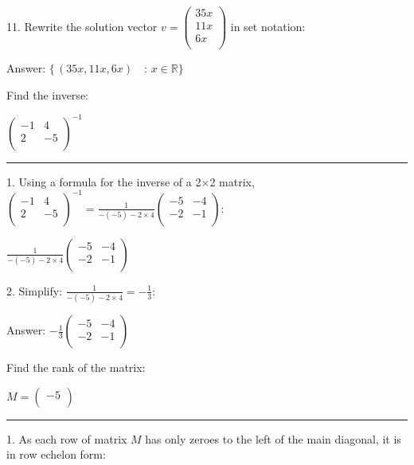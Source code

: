 \documentclass{article}
\begin{document}
11. Rewrite the solution vector $v=\left(
\begin{array}{c}
35 x \\
 11 x \\
 6 x \\
\end{array}
\right)$ in set notation:

Answer: $\{\, (35 x,11 x,6 x)\,\text{ $\, $: }x\in \mathbb{R}\}$

\pagebreak

Find the inverse:

$\left(
\begin{array}{cc}
-1 & 4 \\
 2 & -5 \\
\end{array}
\right)^{-1}$

\hrule

1. Using a formula for the inverse of a 2$\times $2 matrix, $\left(
\begin{array}{cc}
-1 & 4 \\
 2 & -5 \\
\end{array}
\right)^{-1}=\frac{1}{-(-5)-2\times 4}\left(
\begin{array}{cc}
-5 & -4 \\
 -2 & -1 \\
\end{array}
\right):$

$\frac{1}{-(-5)-2\times 4}\left(
\begin{array}{cc}
-5 & -4 \\
 -2 & -1 \\
\end{array}
\right)$

2. Simplify: $\frac{1}{-(-5)-2\times 4}=-\frac{1}{3}$:

Answer: $-\frac{1}{3}\left(
\begin{array}{cc}
-5 & -4 \\
 -2 & -1 \\
\end{array}
\right)$

\pagebreak

Find the rank of the matrix:

$M=\left(
\begin{array}{c}
-5 \\
\end{array}
\right)$

\hrule

1. As each row of matrix $M$ has only zeroes to the left of the main diagonal, it is in row echelon form:
\end{document}
